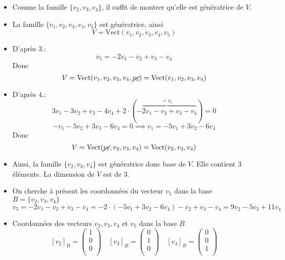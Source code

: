 \documentclass[
    11pt,
    a4paper,
    oneside,
    headinlcude, footinclude,
    twoside,
]{report}
\begin{document}
\begin{itemize}
    \item Comme la famille $\{v_{2}, v_{3}, v_{4}\}$, il suffit de montrer
        qu'elle est génératrice de $V$.

    \item La famille $\{v_{1}, v_{2}, v_{3}, v_{4}, v_{5}\}$ est génératrice,
        ainsi $$V = \text{Vect}(v_{1}, v_{2}, v_{3}, v_{4}, v_{5}) $$

    \item D'après $3.:$ $$v_{5} = -2 v_{1} - v_{2} + v_{3} - v_{4}$$ Donc $$V =
        \text{Vect}(v_{1}, v_{2}, v_{3}, v_{4}, \cancel{v_{5}}) = \text{Vect}(v_{1}, v_{2}, v_{3}, v_{4})$$

    \item D'après $4.$: $$3 v_{1} - 3v_{2} + v_{3} - 4 v_{4} + 2 \cdot
        (\overbrace{-2v_{1} - v_{2} +v_{3} - v_{4}}^{=v_{5}}) = 0$$
        $$-v_{1} - 5 v_{2} + 3 v_{3} - 6 v_{4} = 0 \implies v_{1} = -5v_{1} +
        3v_{2} - 6v_{4}$$
        Donc $$V = \text{Vect}(\cancel{v_{1}}, v_{2}, v_{3}, v_{4}) =
        \text{Vect}(v_{2}, v_{3}, v_{4})$$

    \item Ainsi, la famille $\{v_{2}, v_{3}, v_{4}\}$ est génératrice donc
        base de $V$. Elle contient 3 éléments. La dimension de $V$ est de 3.

    \item On cherche à présent les coordonnées du vecteur $v_{5}$ dans la base
        $B = \{v_{2}, v_{3}, v_{4}\}$ $$v_{5} = -2v_{1} - v_{2} +v_{3} - v_{4}
        = -2 \cdot (-5v_{1} + 3v_{2} - 6v_{4}) - v_{2} + v_{3} - v_{4} = 9
        v_{2} - 5 v_{3} + 11 v_{4}$$

    \item Coordonnées des vecteurs $v_{2}, v_{3}, v_{4}$ et $v_{5}$ dans la
        base $B$ $$
            [v_{2}]_{B} = \left( 
                \begin{array}{c} 
                    1\\
                    0\\
                    0\\ 
                \end{array} 
            \right) \quad 
            [v_{3}]_{B} = \left( 
                \begin{array}{c} 
                    0\\
                    1\\
                    0\\ 
                \end{array} 
            \right) \quad 
            [v_{4}]_{B} = \left( 
                \begin{array}{c} 
                    0\\
                    0\\
                    1\\ 
                \end{array} 
            \right) 
            $$


\end{itemize}
\end{document}
